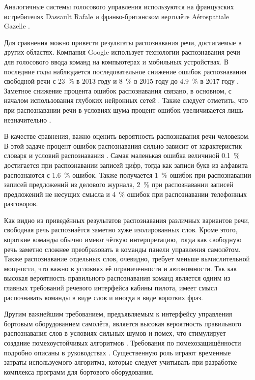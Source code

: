 Аналогичные системы голосового управления используются на французских истребителях Dassault Rafale \cite{dassault} и франко-британском вертолёте Aérospatiale Gazelle \cite{gazelle}.

Для сравнения можно привести результаты распознавания речи, достигаемые в других областях.
Компания Google использует технологии распознавания речи для голосового ввода команд на компьютерах и мобильных устройствах.
В последние годы наблюдается последовательное снижение ошибок распознавания свободной речи с 23~\% в 2013 году и 8~\% в 2015 году до 4.9~\% в 2017 году \cite{google2017speech}.
Заметное снижение процента ошибок распознавания связано, в основном, с началом использования глубоких нейронных сетей \cite{chan2018speech}.
Также следует отметить, что при распознавании речи в условиях шума процент ошибок увеличивается лишь незначительно \cite{chan2016listen}.

В качестве сравнения, важно оценить вероятность распознавания речи человеком.
В этой задаче процент ошибок распознавания сильно зависит от характеристик словаря и условий распознавания \cite{lippmann1997speech}.
Самая маленькая ошибка величиной 0.1~\% достигается при распознавании записей цифр, тогда как записи букв из алфавита распознаются с 1.6~\% ошибок.
Также получается 1~\% ошибок при распознавании записей предложений из делового журнала, 2~\% при распознавании записей предложений не несущих смысла и 4~\% ошибок при распознавании телефонных разговоров.

Как видно из приведённых результатов распознавания различных вариантов речи, свободная речь распознаётся заметно хуже изолированных слов.
Кроме этого, короткие команды обычно имеют чёткую интерпретацию, тогда как свободную речь заметно сложнее преобразовать в команды панели управления самолётом.
Также распознавание отдельных слов, очевидно, требует меньше вычислительной мощности, что важно в условиях её ограниченности и автономности.
Так как высокая вероятность правильного распознавания команд является одним из главных требований речевого интерфейса кабины пилота, имеет смысл распознавать команды в виде слов и иногда в виде коротких фраз.

Другим важнейшим требованием, предъявляемым к интерфейсу управления бортовым оборудованием самолёта, является высокая вероятность правильного распознавания слов в условиях сильных шумов и помех, что стимулирует создание помехоустойчивых алгоритмов \cite{bandaros2008usage, korsun2014algo, korsun2012results, korsun2013experimental, hirsch2000aurora, schmidt2000speech}.
Требования по помехозащищённости подробно описаны в руководствах \cite{aviaizdat2010p4754, aviaizdat2010p4761}.
Существенную роль играют временные затраты используемого алгоритма, которые следует учитывать при разработке комплекса программ для бортового оборудования.

